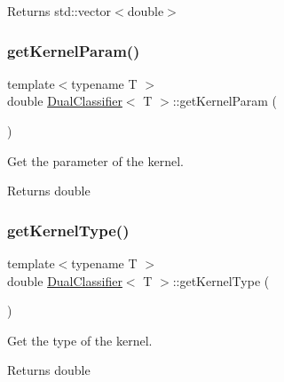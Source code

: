 \begin{DoxyReturn}{Returns}
std\+::vector$<$double$>$ 
\end{DoxyReturn}
\mbox{\label{class_dual_classifier_ad5cc383587a3388bfc370879d76b8cf6}} 
\subsubsection{\texorpdfstring{get\+Kernel\+Param()}{getKernelParam()}}
{\footnotesize\ttfamily template$<$typename T $>$ \\
double \mbox{\hyperlink{class_dual_classifier}{Dual\+Classifier}}$<$ T $>$\+::get\+Kernel\+Param (\begin{DoxyParamCaption}{ }\end{DoxyParamCaption})\hspace{0.3cm}{\ttfamily [inline]}}



Get the parameter of the kernel. 

\begin{DoxyReturn}{Returns}
double 
\end{DoxyReturn}
\mbox{\label{class_dual_classifier_ae15bdcaa9b46e1084aa2df7170a0217f}} 
\subsubsection{\texorpdfstring{get\+Kernel\+Type()}{getKernelType()}}
{\footnotesize\ttfamily template$<$typename T $>$ \\
double \mbox{\hyperlink{class_dual_classifier}{Dual\+Classifier}}$<$ T $>$\+::get\+Kernel\+Type (\begin{DoxyParamCaption}{ }\end{DoxyParamCaption})\hspace{0.3cm}{\ttfamily [inline]}}



Get the type of the kernel. 

\begin{DoxyReturn}{Returns}
double 
\end{DoxyReturn}
\mbox{\label{class_dual_classifier_a4f4cc830f9f9723592dc92957aec5d48}} 
